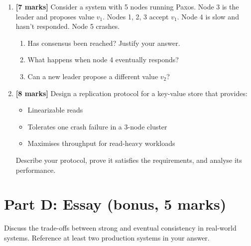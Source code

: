 \documentclass[
    language=english,
    doctype=quiz,
    institution=none,
]{../../omnilatex}
\begin{document}
\begin{enumerate}
    \item \textbf{[7 marks]} Consider a system with 5 nodes running
      Paxos. Node 3 is the leader and proposes value $v_1$. Nodes 1, 2,
      3 accept $v_1$. Node 4 is slow and hasn't responded. Node 5
      crashes.
    \begin{enumerate}
        \item Has consensus been reached? Justify your answer.
        \item What happens when node 4 eventually responds?
        \item Can a new leader propose a different value $v_2$?
    \end{enumerate}

    \item \textbf{[8 marks]} Design a replication protocol for a
      key-value store that provides:
    \begin{itemize}
        \item Linearizable reads
        \item Tolerates one crash failure in a 3-node cluster
        \item Maximises throughput for read-heavy workloads
    \end{itemize}
    Describe your protocol, prove it satisfies the requirements, and
    analyse its performance.
\end{enumerate}

\section*{Part D: Essay (bonus, 5 marks)}

Discuss the trade-offs between strong and eventual consistency in
real-world systems. Reference at least two production systems in
your answer.
\end{document}

